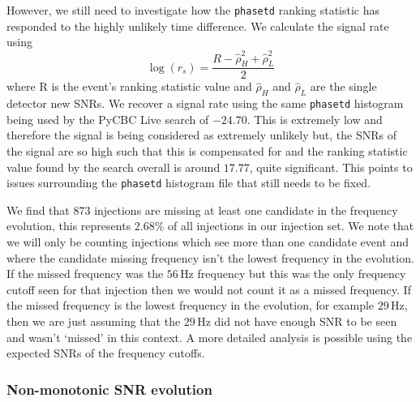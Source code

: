 However, we still need to investigate how the \verb|phasetd| ranking statistic has responded to the highly unlikely time difference. We calculate the signal rate using
%
\begin{equation}
    \log(r_s) = \frac{R - \hat{\rho}_{H}^{2} + \hat{\rho}_{L}^2}{2}
\end{equation}
%
where R is the event's ranking statistic value and $\hat{\rho}_{H}$ and $\hat{\rho}_{L}$ are the single detector new SNRs. We recover a signal rate using the same \verb|phasetd| histogram being used by the PyCBC Live search of $-24.70$. This is extremely low and therefore the signal is being considered as extremely unlikely but, the SNRs of the signal are so high such that this is compensated for and the ranking statistic value found by the search overall is around $17.77$, quite significant. This points to issues surrounding the \verb|phasetd| histogram file that still needs to be fixed.

We find that $873$ injections are missing at least one candidate in the frequency evolution, this represents $2.68\%$ of all injections in our injection set. We note that we will only be counting injections which see more than one candidate event and where the candidate missing frequency isn't the lowest frequency in the evolution. If the missed frequency was the $56 \, \text{Hz}$ frequency but this was the only frequency cutoff seen for that injection then we would not count it as a missed frequency. If the missed frequency is the lowest frequency in the evolution, for example $29 \, \text{Hz}$, then we are just assuming that the $29 \, \text{Hz}$ did not have enough SNR to be seen and wasn't `missed' in this context. A more detailed analysis is possible using the expected SNRs of the frequency cutoffs.

\subsubsection{\label{6:sec:non-mono-snr}Non-monotonic SNR evolution}

